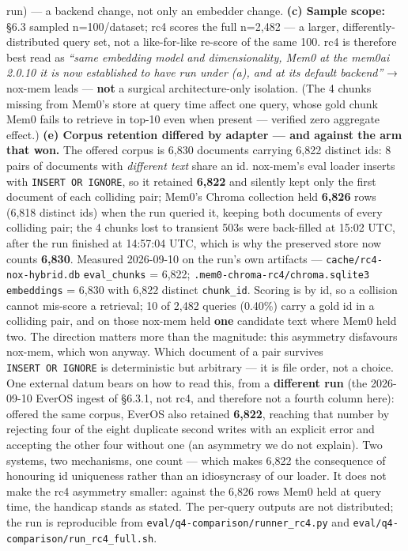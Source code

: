 \documentclass[
]{article}
\begin{document}
run) --- a backend change, not only an embedder change. \textbf{(c)
Sample scope:} §6.3 sampled n=100/dataset; rc4 scores the full n=2,482
--- a larger, differently-distributed query set, not a like-for-like
re-score of the same 100. rc4 is therefore best read as \emph{``same
embedding model and dimensionality, Mem0 at the mem0ai 2.0.10 it is now
established to have run under (a), and at its default backend''} →
nox-mem leads --- \textbf{not} a surgical architecture-only isolation.
(The 4 chunks missing from Mem0's store at query time affect one query,
whose gold chunk Mem0 fails to retrieve in top-10 even when present ---
verified zero aggregate effect.) \textbf{(e) Corpus retention differed
by adapter --- and against the arm that won.} The offered corpus is
6,830 documents carrying 6,822 distinct ids: 8 pairs of documents with
\emph{different text} share an id. nox-mem's eval loader inserts with
\texttt{INSERT\ OR\ IGNORE}, so it retained \textbf{6,822} and silently
kept only the first document of each colliding pair; Mem0's Chroma
collection held \textbf{6,826} rows (6,818 distinct ids) when the run
queried it, keeping both documents of every colliding pair; the 4 chunks
lost to transient 503s were back-filled at 15:02 UTC, after the run
finished at 14:57:04 UTC, which is why the preserved store now counts
\textbf{6,830}. Measured 2026-09-10 on the run's own artifacts ---
\texttt{cache/rc4-nox-hybrid.db} \texttt{eval\_chunks} = 6,822;
\texttt{.mem0-chroma-rc4/chroma.sqlite3} \texttt{embeddings} = 6,830
with 6,822 distinct \texttt{chunk\_id}. Scoring is by id, so a collision
cannot mis-score a retrieval; 10 of 2,482 queries (0.40\%) carry a gold
id in a colliding pair, and on those nox-mem held \textbf{one} candidate
text where Mem0 held two. The direction matters more than the magnitude:
this asymmetry disfavours nox-mem, which won anyway. Which document of a
pair survives \texttt{INSERT\ OR\ IGNORE} is deterministic but arbitrary
--- it is file order, not a choice. One external datum bears on how to
read this, from a \textbf{different run} (the 2026-09-10 EverOS ingest
of §6.3.1, not rc4, and therefore not a fourth column here): offered the
same corpus, EverOS also retained \textbf{6,822}, reaching that number
by rejecting four of the eight duplicate second writes with an explicit
error and accepting the other four without one (an asymmetry we do not
explain). Two systems, two mechanisms, one count --- which makes 6,822
the consequence of honouring id uniqueness rather than an idiosyncrasy
of our loader. It does not make the rc4 asymmetry smaller: against the
6,826 rows Mem0 held at query time, the handicap stands as stated. The
per-query outputs are not distributed; the run is reproducible from
\texttt{eval/q4-comparison/runner\_rc4.py} and
\texttt{eval/q4-comparison/run\_rc4\_full.sh}.
\end{document}
